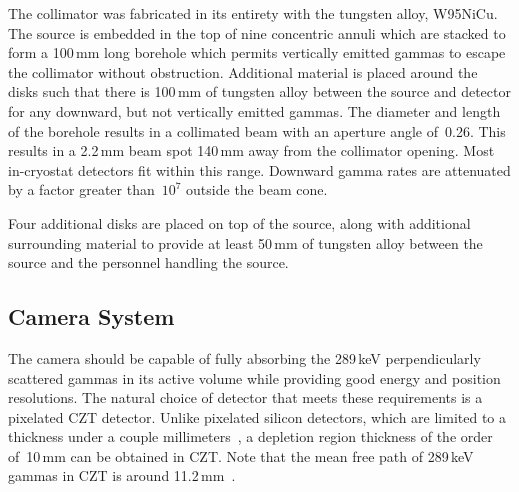 The collimator was fabricated in its entirety with the tungsten alloy, W95NiCu. The source is embedded in the top of nine concentric annuli which are stacked to form a 100\,mm long borehole which permits vertically emitted gammas to escape the collimator without obstruction. Additional material is placed around the disks such that there is 100\,mm of tungsten alloy between the source and detector for any downward, but not vertically emitted gammas. The diameter and length of the borehole results in a collimated beam with an aperture angle of~0.26\textdegree. This results in a 2.2\,mm beam spot 140\,mm away from the collimator opening. Most in-cryostat detectors fit within this range. Downward gamma rates are attenuated by a factor greater than~$10^{7}$ outside the beam cone. 

Four additional disks are placed on top of the source, along with additional surrounding material to provide at least 50\,mm of tungsten alloy between the source and the personnel handling the source. 

\subsection{Camera System}\label{subsec:camera}

The camera should be capable of fully absorbing the 289\,keV perpendicularly scattered gammas in its active volume while providing good energy and position resolutions. The natural choice of detector that meets these requirements is a pixelated CZT detector. Unlike pixelated silicon detectors, which are limited to a thickness under a couple millimeters~\cite{Si_thickness}, a depletion region thickness of the order of~10\,mm can be obtained in CZT. Note that the mean free path of 289\,keV gammas in CZT is around 11.2\,mm~\cite{NIST}. 

